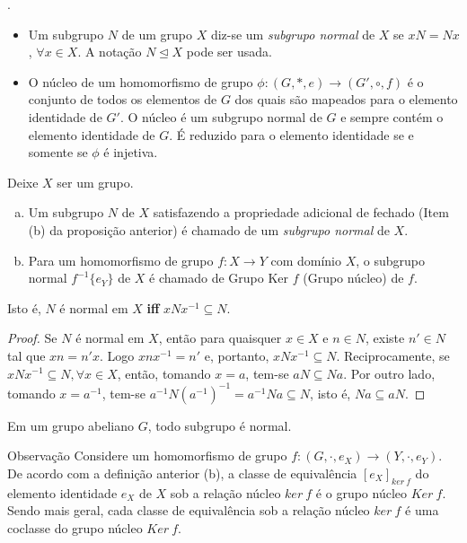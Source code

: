 \newpage
\begin{definition}.
  \begin{itemize}
    \item Um subgrupo $N$ de um grupo $X$ diz-se um \emph{subgrupo normal} de $X$ se $xN = Nx$, $\forall x \in X$. A notação $N \trianglelefteq X$ pode ser usada.
    \item O núcleo de um homomorfismo de grupo $\phi: (G, * , e) \to (G', \circ , f)$ é o conjunto de todos os elementos de $G$ dos quais são mapeados para o elemento identidade de $G'$. O núcleo é um subgrupo normal de $G$ e sempre contém o elemento identidade de $G$. É reduzido para o elemento identidade se e somente se $\phi$ é injetiva.
  \end{itemize}

  Deixe $X$ ser um grupo.
  \begin{enumerate}[(a)]
    \item Um subgrupo $N$ de $X$ satisfazendo a propriedade adicional de fechado (Item (b) da proposição anterior) é chamado de um \emph{subgrupo normal} de $X$.
    \item Para um homomorfismo de grupo $f: X\to Y$ com domínio $X$, o subgrupo normal $f^{-1}\{e_{Y}\}$ de $X$ é chamado de Grupo Ker $f$ (Grupo núcleo) de $f$.
  \end{enumerate}
Isto é, $N$ é normal em $X$ \textbf{iff} $xNx^{-1} \subseteq N$. 
\begin{proof}
  Se $N$ é normal em $X$, então para quaisquer $x \in X$ e $n \in N$, existe $n' \in N$ tal que $xn = n'x$. Logo $xnx^{-1} = n'$ e, portanto, $xNx^{-1} \subseteq N$.
  Reciprocamente, se $xNx^{-1} \subseteq N, \forall x \in X$, então, tomando $x = a$, tem-se $aN \subseteq Na$. Por outro lado, tomando $x = a^{-1}$, tem-se $a^{-1}N(a^{-1})^{-1} = a^{-1}Na \subseteq N$, isto é, $Na \subseteq aN$.
\end{proof}


\end{definition}
\begin{stat}
  Em um grupo abeliano $G$, todo subgrupo é normal.
\end{stat}
\begin{mymdframed}{Observação}
  Considere um homomorfismo de grupo $f: (G,\cdot,e_{X}) \to (Y,\cdot,e_{Y})$. De acordo com a definição anterior (b), a classe de equivalência $[e_{X}]_{ker\ f}$ do elemento identidade $e_{X}$ de $X$ sob a relação núcleo $ker\ f$ é o grupo núcleo $Ker\ f$. Sendo mais geral, cada classe de equivalência sob a relação núcleo $ker\ f$ é uma coclasse do grupo núcleo $Ker\ f$.
\end{mymdframed}
